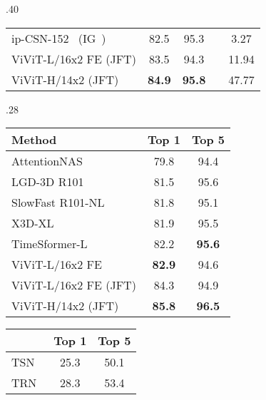 \documentclass[10pt,twocolumn,letterpaper]{article}
\begin{document}
\begin{table*}[tb]
\begin{subtable}[t]{.40\linewidth}
{\begin{tabular}{lcccc}
				ip-CSN-152~\cite{tran_iccv_2019} (IG~\cite{mahajan_eccv_2018}) 			  &  82.5					& 95.3			&   & 3.27	  \\
				ViViT-L/16x2 FE (JFT) 														& 83.5 	&  94.3   &  &  11.94 \\  ViViT-H/14x2 (JFT) 														&  \textbf{84.9} &  \textbf{95.8} 	&  & 47.77 \\  \bottomrule
			\end{tabular}
		}
		\label{tab:sota_kinetics400}
	\end{subtable}
  	\hfill
  	\begin{subtable}[t]{.28\linewidth}
		\centering
  		\caption{Kinetics 600}
  		\setlength{\tabcolsep}{4pt} \vspace{-0.3\baselineskip}
  		\scriptsize{
	  		\begin{tabular}{lcc}
	  			\toprule
	  			Method 																			 & Top 1                & Top 5      \\ \midrule
	  			AttentionNAS~\cite{wang_nas_eccv_2020}						  &  79.8				   & 94.4  \\ LGD-3D R101~\cite{qiu_lgd_cvpr_2019}							&  81.5				    & 95.6	\\ SlowFast R101-NL~\cite{feichtenhofer_iccv_2019}       		&  81.8                     &  95.1   \\ X3D-XL~\cite{feichtenhofer_cvpr_2020}      						 &  81.9					&  95.5		\\ TimeSformer-L~\cite{bertasius_arxiv_2021}					  & 82.2				& \textbf{95.6}		\\ ViViT-L/16x2 FE 														  	 &  \textbf{82.9} 	& 94.6  \\  \midrule
	  			ViViT-L/16x2 FE (JFT) 													 & 84.3 & 94.9 \\ ViViT-H/14x2 (JFT) 													& \textbf{85.8} & \textbf{96.5} \\ \bottomrule
	  		\end{tabular}
	  		\label{tab:sota_kinetics600}
  		}
  		\vspace{0.35\baselineskip} \centering
  		\caption{Moments in Time}
  		\vspace{-0.3\baselineskip}
  		\setlength{\tabcolsep}{6pt} \scriptsize{
  			\begin{tabular}{lcc}
  				\toprule
  				& Top 1 & Top 5 \\ 
  				\midrule
  				TSN~\cite{wang_tsn_eccv_2016}				& 25.3		 &  50.1	\\
  				TRN~\cite{zhou_trn_eccv_2018}				 & 28.3		 &  53.4	 \\

\end{tabular}}
\end{subtable}
\end{table*}
\end{document}
